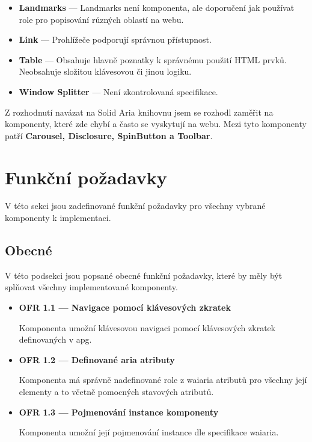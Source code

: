 \begin{itemize}
      \item \textbf{Landmarks} --- Landmarks není komponenta, ale doporučení jak používat role pro popisování různých oblastí na webu.
      \item \textbf{Link} --- Prohlížeče podporují správnou přístupnost.
      \item \textbf{Table} --- Obsahuje hlavně poznatky k správnému použití HTML prvků. Neobsahuje složitou klávesovou či jinou logiku.
      \item \textbf{Window Splitter} --- Není zkontrolovaná specifikace.
\end{itemize}

Z rozhodnutí navázat na Solid Aria knihovnu jsem se rozhodl zaměřit na komponenty, které zde chybí a často se vyskytují na webu.
Mezi tyto komponenty patří \textbf{Carousel, Disclosure, SpinButton a Toolbar}.

\section{Funkční požadavky}

V této sekci jsou zadefinované funkční požadavky pro všechny vybrané komponenty k implementaci.

\subsection{Obecné}

V této podsekci jsou popsané obecné funkční požadavky, které by měly být splňovat všechny implementované komponenty.

\begin{itemize}
      \item \textbf{OFR 1.1 --- Navigace pomocí klávesových zkratek}\label{ofr11}

            Komponenta umožní klávesovou navigaci pomocí klávesových zkratek definovaných v \gls{apg}.

      \item \textbf{OFR 1.2 --- Definované aria atributy}\label{ofr12}

            Komponenta má správně nadefinované role z \gls{waiaria} atributů pro všechny její elementy a to včetně pomocných stavových atributů.

      \item \textbf{OFR 1.3 --- Pojmenování instance komponenty}\label{ofr13}

            Komponenta umožní její pojmenování instance dle specifikace \gls{waiaria}.
\end{itemize}

